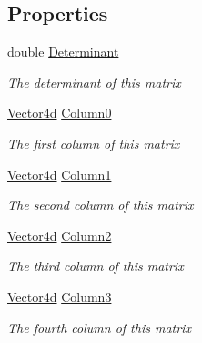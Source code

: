 \subsection*{Properties}
\begin{DoxyCompactItemize}
\item 
double \hyperlink{struct_open_t_k_1_1_matrix4d_adf0dd00b8e2c98dc1d710144d831baba}{Determinant}
\begin{DoxyCompactList}\small\item\em The determinant of this matrix \end{DoxyCompactList}\item 
\hyperlink{struct_open_t_k_1_1_vector4d}{Vector4d} \hyperlink{struct_open_t_k_1_1_matrix4d_a3835b3cd858e49706ba401be94fdf43a}{Column0}
\begin{DoxyCompactList}\small\item\em The first column of this matrix \end{DoxyCompactList}\item 
\hyperlink{struct_open_t_k_1_1_vector4d}{Vector4d} \hyperlink{struct_open_t_k_1_1_matrix4d_a81716156eeb21eff89a4bcb31025e521}{Column1}
\begin{DoxyCompactList}\small\item\em The second column of this matrix \end{DoxyCompactList}\item 
\hyperlink{struct_open_t_k_1_1_vector4d}{Vector4d} \hyperlink{struct_open_t_k_1_1_matrix4d_aa6ee0a1972252133098f8e333d9afe69}{Column2}
\begin{DoxyCompactList}\small\item\em The third column of this matrix \end{DoxyCompactList}\item 
\hyperlink{struct_open_t_k_1_1_vector4d}{Vector4d} \hyperlink{struct_open_t_k_1_1_matrix4d_a83998c5b965ea046bb22725b94c39e2f}{Column3}
\begin{DoxyCompactList}\small\item\em The fourth column of this matrix \end{DoxyCompactList}\item 

\end{DoxyCompactItemize}
